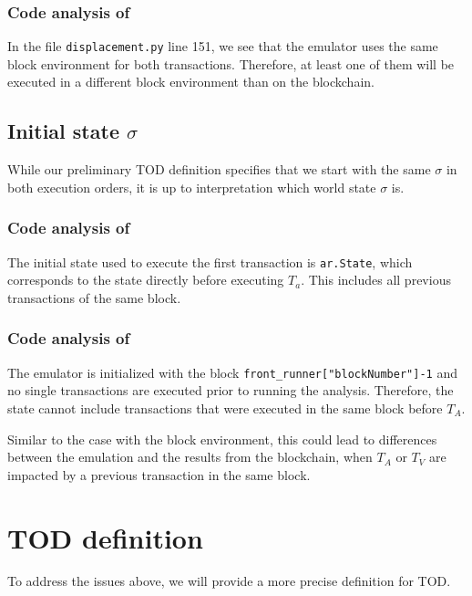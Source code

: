 \documentclass[draft,final]{vutinfth} %
\begin{document}
\subsubsection{Code analysis of \cite{torres_frontrunner_2021}}

In the file \verb|displacement.py| line 151, we see that the emulator uses the same block environment for both transactions. Therefore, at least one of them will be executed in a different block environment than on the blockchain.

\subsection{Initial state $\sigma$}

While our preliminary TOD definition specifies that we start with the same $\sigma$ in both execution orders, it is up to interpretation which world state $\sigma$ is.

\subsubsection{Code analysis of \cite{zhang_combatting_2023}}

The initial state used to execute the first transaction is \verb|ar.State|, which corresponds to the state directly before executing $T_a$. This includes all previous transactions of the same block.

\subsubsection{Code analysis of \cite{torres_frontrunner_2021}}

The emulator is initialized with the block \verb|front_runner["blockNumber"]-1| and no single transactions are executed prior to running the analysis. Therefore, the state cannot include transactions that were executed in the same block before $T_A$.

Similar to the case with the block environment, this could lead to differences between the emulation and the results from the blockchain, when $T_A$ or $T_V$ are impacted by a previous transaction in the same block.

\section{TOD definition}

To address the issues above, we will provide a more precise definition for TOD.
\end{document}
